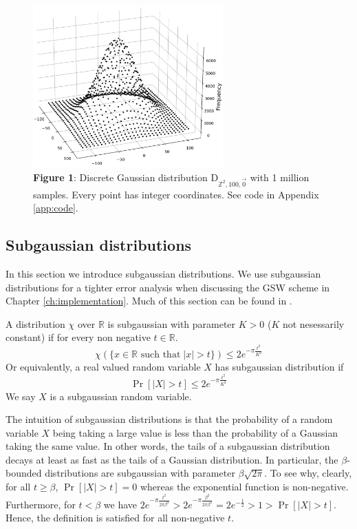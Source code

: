 \begin{figure}
    \centering
    \hypertarget{fig:discrete-gauss}{}
    \includegraphics[width=0.65\textwidth]{figures/D-G-2d-a_is_100-n_1000000.pdf}
    \caption*{\textbf{Figure 1}: Discrete Gaussian distribution $\textrm{D}_{\mathbb{Z}^2, 100, \vec{0}}$ with 1 million samples. Every point has integer coordinates. See code in Appendix \ref{app:code}.}
\end{figure}

\subsection*{Subgaussian distributions}
In this section we introduce subgaussian distributions. We use subgaussian distributions for a tighter error analysis when discussing the GSW scheme in Chapter \ref{ch:implementation}. Much of this section can be found in \cite{A-S-P-boot}.
\begin{definition}
    A distribution $\chi$ over $\mathbb{R}$ is subgaussian with parameter $K > 0$ ($K$ not nesessarily constant) if for every non negative $t \in \mathbb{R}$.
    \begin{equation*}
        \chi(\{x \in \mathbb{R} \text{ such that} \; |x| > t\}) \leq 2e^{- \pi \frac{t^2}{K^2}}
    \end{equation*}
    Or equivalently, a real valued random variable $X$ has subgaussian distribution if
    \begin{equation*}
        \operatorname{Pr}[|X|>t] \leq 2e^{- \pi \frac{t^2}{K^2}}
    \end{equation*}
    We say $X$ is a subgaussian random variable.
\end{definition}
The intuition of subgaussian distributions is that the probability of a random variable $X$ being taking a large value is less than the probability of a Gaussian taking the same value. In other words, the tails of a subgaussian distribution decays at least as fast as the tails of a Gaussian distribution. In particular, the $\beta$-bounded distributions are subgaussian with parameter $\beta \sqrt{2\pi}$. To see why, clearly, for all $t \geq \beta$, $\operatorname{Pr}[|X|>t] = 0$ whereas the exponential function is non-negative. Furthermore, for $t < \beta$ we have $2e^{- \pi \frac{t^2}{2\pi \beta^2}} > 2e^{- \pi \frac{\beta^2}{2\pi \beta^2}} = 2e^{-\frac{1}{2}} > 1 > \operatorname{Pr}[|X|>t]$. Hence, the definition is satisfied for all non-negative $t$.

